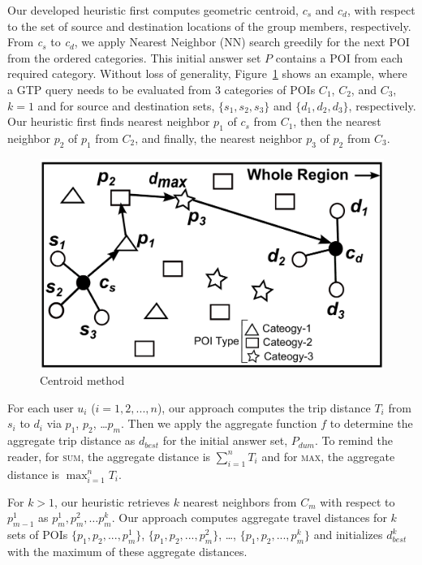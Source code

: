 Our developed heuristic first computes geometric centroid, $c_s$ and $c_d$, with respect to the set of source and destination locations of the group members, respectively. From \textit{c$_{s}$} to \textit{c$_{d}$}, we apply Nearest Neighbor (NN) search greedily for the next POI from the ordered categories. This initial answer set $P$ contains a POI from each required category. Without loss of generality, Figure~\ref{fig:centroid} shows an example, where a GTP query needs to be evaluated from 3 categories of POIs $C_1$, $C_2$, and $C_3$, $k=1$ and for source and destination sets, $\{s_1, s_2, s_3\}$ and $\{d_1, d_2, d_3\}$, respectively. Our heuristic first finds nearest neighbor $p_1$ of $c_s$ from $C_1$, then the nearest neighbor $p_2$ of $p_1$ from $C_2$, and finally, the nearest neighbor $p_3$ of $p_2$ from $C_3$.

\vspace*{12pt}
\begin{figure}[!htbp]
\centering
\includegraphics[width=0.6\columnwidth]{figures/soln1/centroid.pdf}
\caption{Centroid method}
\label{fig:centroid}
\end{figure}
\vspace*{10pt}
For each user $u_i$ ($i=1,2,..., n$), our approach computes the trip distance $T_i$ from $s_i$ to $d_i$ via $p_1$, $p_2$, \dots $p_m$. Then we apply the aggregate function $f$ to determine the aggregate trip distance as $d_{best}$ for the initial answer set, $P_{dum}$. To remind the reader, for \textsc{sum}, the aggregate distance is $\sum_{i=1}^{n} T_i$ and for \textsc{max}, the aggregate distance is $\max_{i=1}^{n} T_i$.

\vspace*{5pt}
For $k>1$, our heuristic retrieves $k$ nearest neighbors from $C_m$ with respect to $p_{m-1}^1$ as $p_m^1, p_m^2, \dots p_m^k$. Our approach computes aggregate travel distances for $k$ sets of POIs $\{p_1, p_2,..., p_m^1\}$, $\{p_1, p_2,..., p_m^2\}$, \dots, $\{p_1, p_2,..., p_m^k\}$ and initializes $d_{best}^k$ with the maximum of these aggregate distances.

